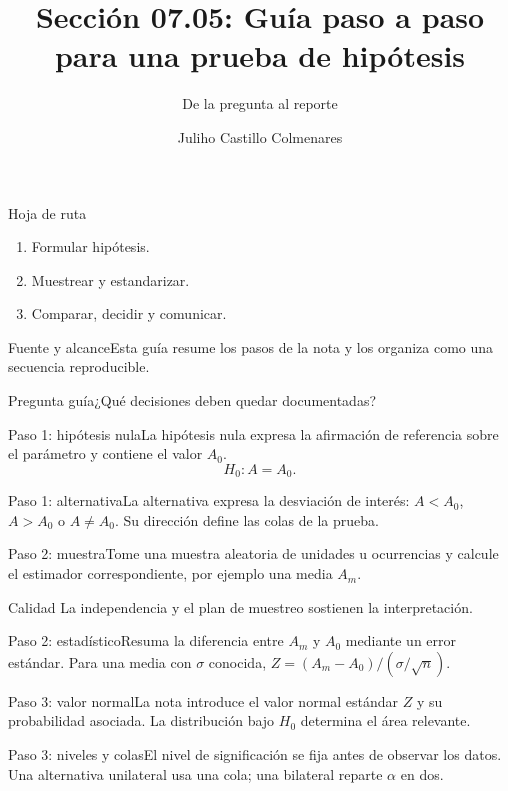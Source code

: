 \documentclass[10pt,aspectratio=169]{beamer}
\title[Guía de pruebas de hipótesis]{Sección 07.05: Guía paso a paso para una prueba de hipótesis}\subtitle{De la pregunta al reporte}
\author[J. Castillo Colmenares]{Juliho Castillo Colmenares}\institute{Tecnológico de Monterrey}\date{}
\begin{document}
\begin{frame}[plain]\titlepage\end{frame}
\begin{frame}{Hoja de ruta}\small\begin{enumerate}\item Formular hipótesis.\item Muestrear y estandarizar.\item Comparar, decidir y comunicar.\end{enumerate}\end{frame}
\begin{frame}{Fuente y alcance}\small Esta guía resume los pasos de la nota y los organiza como una secuencia reproducible.\begin{block}{Pregunta guía}¿Qué decisiones deben quedar documentadas?\end{block}\end{frame}
\begin{frame}{Paso 1: hipótesis nula}\small La hipótesis nula expresa la afirmación de referencia sobre el parámetro y contiene el valor $A_0$.\[H_0:A=A_0.\]\end{frame}
\begin{frame}{Paso 1: alternativa}\small La alternativa expresa la desviación de interés: $A<A_0$, $A>A_0$ o $A\neq A_0$. Su dirección define las colas de la prueba.\end{frame}
\begin{frame}{Paso 2: muestra}\small Tome una muestra aleatoria de unidades u ocurrencias y calcule el estimador correspondiente, por ejemplo una media $A_m$.\begin{alertblock}{Calidad} La independencia y el plan de muestreo sostienen la interpretación.\end{alertblock}\end{frame}
\begin{frame}{Paso 2: estadístico}\small Resuma la diferencia entre $A_m$ y $A_0$ mediante un error estándar. Para una media con $\sigma$ conocida, $Z=(A_m-A_0)/(\sigma/\sqrt n)$.\end{frame}
\begin{frame}{Paso 3: valor normal}\small La nota introduce el valor normal estándar $Z$ y su probabilidad asociada. La distribución bajo $H_0$ determina el área relevante.\end{frame}
\begin{frame}{Paso 3: niveles y colas}\small El nivel de significación se fija antes de observar los datos. Una alternativa unilateral usa una cola; una bilateral reparte $\alpha$ en dos.\end{frame}
\end{document}
